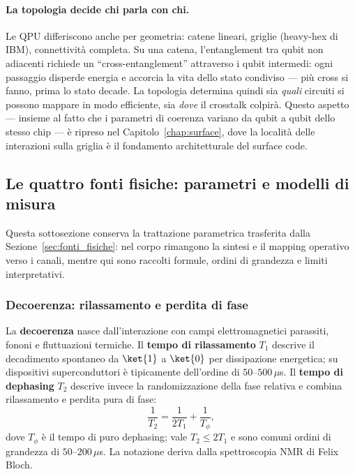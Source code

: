 \paragraph{La topologia decide chi parla con chi.}
Le QPU differiscono anche per geometria: catene lineari, griglie (heavy-hex di IBM), connettività completa. Su una catena, l'entanglement tra qubit non adiacenti richiede un ``cross-entanglement'' attraverso i qubit intermedi: ogni passaggio disperde energia e accorcia la vita dello stato condiviso --- più cross si fanno, prima lo stato decade. La topologia determina quindi sia \emph{quali} circuiti si possono mappare in modo efficiente, sia \emph{dove} il crosstalk colpirà. Questo aspetto --- insieme al fatto che i parametri di coerenza variano da qubit a qubit dello stesso chip --- è ripreso nel Capitolo~\ref{chap:surface}, dove la località delle interazioni sulla griglia è il fondamento architetturale del surface code.

\subsection{Le quattro fonti fisiche: parametri e modelli di misura}
\label{app:fonti_fisiche_estese}

Questa sottosezione conserva la trattazione parametrica trasferita dalla
Sezione~\ref{sec:fonti_fisiche}: nel corpo rimangono la sintesi e il mapping
operativo verso i canali, mentre qui sono raccolti formule, ordini di grandezza
e limiti interpretativi.

\subsubsection{Decoerenza: rilassamento e perdita di fase}

La \textbf{decoerenza} nasce dall'interazione con campi elettromagnetici
parassiti, fononi e fluttuazioni termiche. Il \textbf{tempo di rilassamento}
$T_1$ descrive il decadimento spontaneo da $\ket{1}$ a $\ket{0}$ per
dissipazione energetica; su dispositivi superconduttori è tipicamente
dell'ordine di $50$--$500\,\mu$s. Il \textbf{tempo di dephasing} $T_2$
descrive invece la randomizzazione della fase relativa e combina rilassamento e
perdita pura di fase:
\begin{equation}
    \frac{1}{T_2}=\frac{1}{2T_1}+\frac{1}{T_\phi},
    \label{eq:T2_decomp}
\end{equation}
dove $T_\phi$ è il tempo di puro dephasing; vale $T_2\leq2T_1$ e sono comuni
ordini di grandezza di $50$--$200\,\mu$s. La notazione deriva dalla
spettroscopia \ac{NMR} di Felix Bloch.

